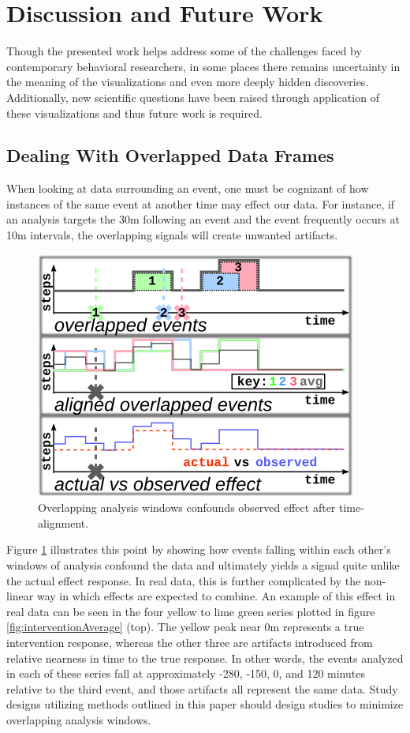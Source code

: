 \section{Discussion and Future Work}
Though the presented work helps address some of the challenges faced by contemporary behavioral researchers, in some places there remains uncertainty in the meaning of the visualizations and even more deeply hidden discoveries.
Additionally, new scientific questions have been raised through application of these visualizations and thus future work is required.


\subsection{Dealing With Overlapped Data Frames}
When looking at data surrounding an event, one must be cognizant of how instances of the same event at another time may effect our data.
For instance, if an analysis targets the 30m following an event and the event frequently occurs at 10m intervals, the overlapping signals will create unwanted artifacts.

\begin{figure}
\centering
\includegraphics[width=0.6\columnwidth]{./img/eventOverlapExample.png}
\caption{Overlapping analysis windows confounds observed effect after time-alignment.}
\label{fig:overlapExample}
\end{figure}

Figure \ref{fig:overlapExample} illustrates this point by showing how events falling within each other's windows of analysis confound the data and ultimately yields a signal quite unlike the actual effect response.
In real data, this is further complicated by the non-linear way in which effects are expected to combine.
An example of this effect in real data can be seen in the four yellow to lime green series plotted in figure \ref{fig:interventionAverage} (top).
The yellow peak near 0m represents a true intervention response, whereas the other three are artifacts introduced from relative nearness in time to the true response.
In other words, the events analyzed in each of these series fall at approximately -280, -150, 0, and 120 minutes relative to the third event, and those artifacts all represent the same data.
Study designs utilizing methods outlined in this paper should design studies to minimize overlapping analysis windows.

